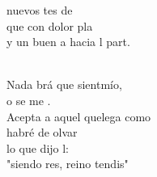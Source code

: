 \documentclass[12pt]{article}
\begin{document}
\begin{multicols*}{2}
\begin{cancion}
	nuevos tes de  \\
	que con dolor pla \\
	y un buen a hacia l part.  \\\jump\\
	\begin{chorus}%
	Nada brá que sientmío,\\
	o se me .\\
	Acepta a aquel quelega como  \\
	 habré de olvar  \\
	lo que dijo l:\\
	"siendo res,  reino tendis"\\
	\end{chorus}%
	\jump\\
\end{cancion}%


\end{multicols*}
\end{document}
